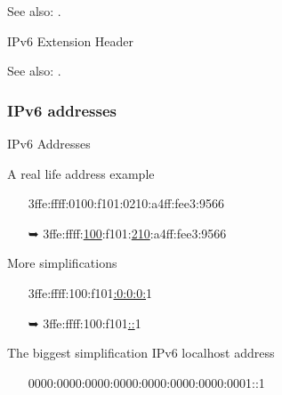 See also: .

\begin{frame}{IPv6 Extension Header}
  \begin{center}
  \end{center}
\end{frame}

See also: .

\subsubsection{IPv6 addresses}

\begin{frame}{IPv6 Addresses}
 \begin{iblock}{A real life address example}{\ttfamily
    \begin{itemize}
    \item[] 3ffe:ffff:0100:f101:0210:a4ff:fee3:9566
    \item[{\dejavu ➥}]
      3ffe:ffff:\underline{100}:f101:\underline{210}:a4ff:fee3:9566
    \end{itemize}}
 \end{iblock}
 \begin{iblock}{More simplifications}{\ttfamily
    \begin{itemize}
    \item[] 3ffe:ffff:100:f101\underline{:0:0:0:}1
    \item[{\dejavu ➥}] 3ffe:ffff:100:f101\underline{::}1
    \end{itemize}}
 \end{iblock}
 \begin{iblock}{The biggest simplification}
   IPv6 localhost address{\ttfamily
     \begin{itemize}
     \item[] 0000:0000:0000:0000:0000:0000:0000:0001\quad ::1
     \end{itemize}}
 \end{iblock}
\end{frame}


